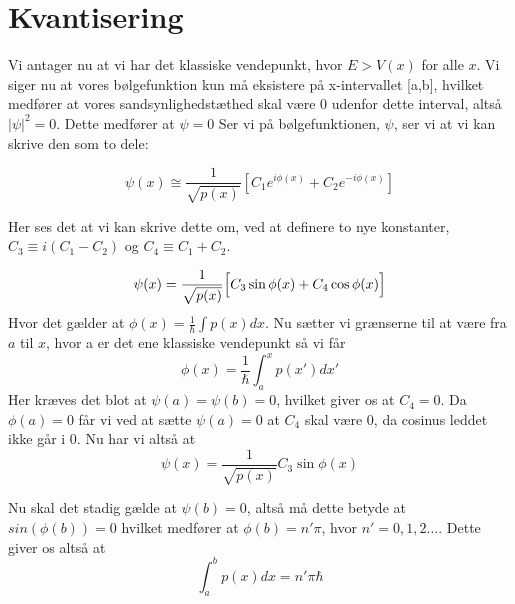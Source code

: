 \section{Kvantisering}
Vi antager nu at vi har det klassiske vendepunkt, hvor $E > V(x) $ for alle $ x$. Vi siger nu at vores bølgefunktion kun må eksistere på x-intervallet [a,b], hvilket medfører at vores sandsynlighedstæthed skal være 0 udenfor dette interval, altså $|\psi|^2 = 0$. Dette medfører at $\psi = 0$
Ser vi på bølgefunktionen, $\psi$, ser vi at vi kan skrive den som to dele:

\begin{equation}
  \psi(x) \cong \frac{1}{\sqrt{p(x)}}\left[C_1e^{i\phi(x)}+C_2e^{-i\phi(x)}\right]
  \label{eq:kvantiseringStart}
\end{equation}

Her ses det at vi kan skrive dette om, ved at definere to nye konstanter, $C_3 \equiv i(C_1-C_2)$ og $C_4 \equiv C_1+C_2$.

\begin{equation}
  \psi(x) = \frac{1}{\sqrt{p(x)}}
  \Bigl[    C_3\sin{\phi(x)}+C_4\cos{\phi(x)}   \Bigr]
  \label{eq:kvantiseringSinCos}
\end{equation}
Hvor det gælder at $\phi(x) = \frac{1}{\hbar}\int p(x) dx$. Nu sætter vi grænserne til at være fra $a$ til $x$, hvor a er det ene klassiske vendepunkt så vi får
\begin{equation}
  \phi(x) = \frac{1}{\hbar}\int_{a}^{x} p(x')dx'
\end{equation}
Her kræves det blot at $\psi(a) = \psi(b) = 0$, hvilket giver os at $C_4 = 0$. Da $\phi(a) = 0$ får vi ved at sætte $\psi(a) = 0$ at $C_4$ skal være 0, da cosinus leddet ikke går i 0.
Nu har vi altså at
\begin{equation}
  \psi(x) = \frac{1}{\sqrt{p(x)}}C_3\sin{\phi(x)}
\end{equation}

Nu skal det stadig gælde at $\psi(b) = 0$, altså må dette betyde at $sin(\phi(b)) = 0$ hvilket medfører at $\phi(b) = n'\pi$, hvor $n' = 0,1,2...$.
Dette giver os altså at
\begin{equation}
  \int_{a}^{b} p(x) dx = n'\pi\hbar
\end{equation}
